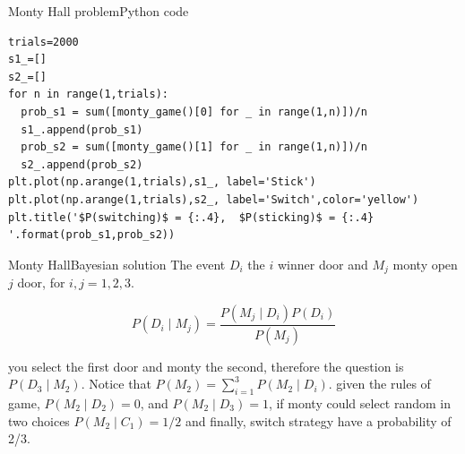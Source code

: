 \documentclass{beamer}
\begin{document}
\begin{frame}[fragile]{Monty Hall problem}{Python code}
\begin{lstlisting}
trials=2000
s1_=[]
s2_=[]
for n in range(1,trials):
  prob_s1 = sum([monty_game()[0] for _ in range(1,n)])/n
  s1_.append(prob_s1)
  prob_s2 = sum([monty_game()[1] for _ in range(1,n)])/n
  s2_.append(prob_s2)
plt.plot(np.arange(1,trials),s1_, label='Stick')
plt.plot(np.arange(1,trials),s2_, label='Switch',color='yellow')
plt.title('$P(switching)$ = {:.4},  $P(sticking)$ = {:.4} '.format(prob_s1,prob_s2))
\end{lstlisting}
\end{frame}



\begin{frame}{Monty Hall}{Bayesian solution}
The event $D_{i}$ the $i$ winner door and  $M_{j}$ monty open $j$ door, for $i,j=1,2,3$.

\begin{equation}
P(D_{i} \mid M_{j}) = \frac{P(M_{j} \mid D_{i})P(D_{i})}{P(M_{j})}
\end{equation}

you select the first door  and monty the second, therefore the question  is $P(D_{3} \mid M_{2})$.
Notice that $ P(M_{2}) = \sum_{i=1}^{3} P(M_{2} \mid D_{i}) $.  
given the rules of game, 
$P(M_{2} \mid D_{2}) = 0$, and 
$P(M_{2} \mid D_{3}) = 1$, if monty could select random in two choices $P(M_{2} \mid C_{1})=1/2$ and finally, switch strategy have a probability of 2/3.
\end{frame}
\end{document}
